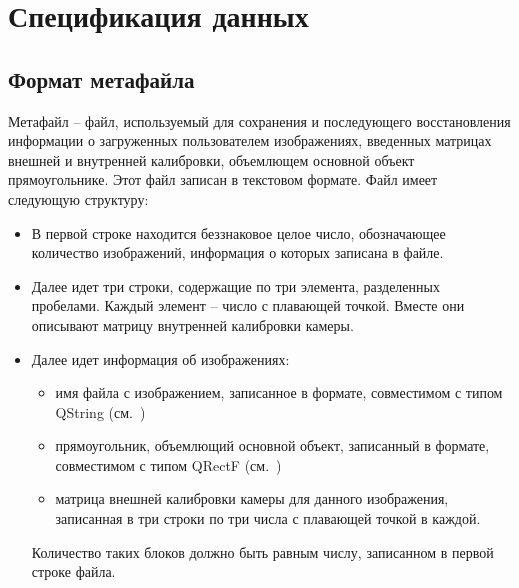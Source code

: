 \section{Спецификация данных}
\subsection{Формат метафайла}
Метафайл -- файл, используемый для сохранения и последующего восстановления информации о загруженных пользователем изображениях, введенных матрицах внешней и внутренней калибровки, объемлющем основной объект прямоугольнике. Этот файл записан в текстовом формате. Файл имеет следующую структуру:
\begin{itemize}
\item В первой строке находится беззнаковое целое число, обозначающее количество изображений, информация о которых записана в файле.
\item Далее идет три строки, содержащие по три элемента, разделенных пробелами. Каждый элемент -- число с плавающей точкой. Вместе они описывают матрицу внутренней калибровки камеры.
\item Далее идет информация об изображениях:
	\begin{itemize}
		\item имя файла с изображением, записанное в формате, совместимом с типом QString (см.~\cite{qt_qstring})
		\item прямоугольник, объемлющий основной объект, записанный в формате, совместимом с типом QRectF (см.~\cite{qt_qrectf})
		\item матрица внешней калибровки камеры для данного изображения, записанная в три строки по три числа с плавающей точкой в каждой.
	\end{itemize}
Количество таких блоков должно быть равным числу, записанном в первой строке файла.
\end{itemize}

